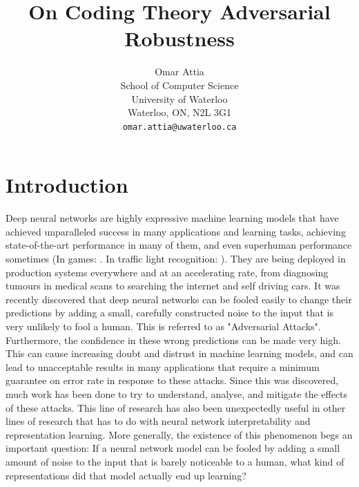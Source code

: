 \documentclass{article}
\title{On Coding Theory Adversarial Robustness}
\author{
	Omar Attia \\
	School of Computer Science\\
	University of Waterloo\\
	Waterloo, ON, N2L 3G1 \\
	\texttt{omar.attia@uwaterloo.ca}
}
\begin{document}
\maketitle

\begin{abstract} 

\end{abstract} 

\section{Introduction}
Deep neural networks are highly expressive machine learning models that have achieved unparalleled success in many applications and learning tasks, achieving state-of-the-art performance in many of them, and even superhuman performance sometimes (In games: \cite{silver2016mastering}. In traffic light recognition: \cite{ciresan2011committee}). They are being deployed in production systems everywhere and at an accelerating rate, from diagnosing tumours in medical scans to searching the internet and self driving cars. It was recently discovered that deep neural networks can be fooled easily to change their predictions by adding a small, carefully constructed noise to the input that is very unlikely to fool a human. This is referred to as "Adversarial Attacks". Furthermore, the confidence in these wrong predictions can be made very high. This can cause increasing doubt and distrust in machine learning models, and can lead to unacceptable results in many applications that require a minimum guarantee on error rate in response to these attacks. Since this was discovered, much work has been done to try to understand, analyse, and mitigate the effects of these attacks. This line of research has also been unexpectedly useful in other lines of research that has to do with neural network interpretability and representation learning. More generally, the existence of this phenomenon begs an important question: If a neural network model can be fooled by adding a small amount of noise to the input that is barely noticeable to a human, what kind of representations did that model actually end up learning?
\end{document}

